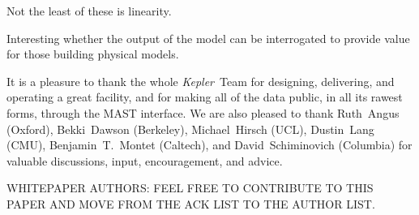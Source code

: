 \documentclass[12pt, preprint]{aastex}
\newcommand{\project}[1]{\textsl{#1}}
\newcommand{\Kepler}{\project{Kepler}}
\begin{document}
Not the least of these is linearity.

Interesting whether the output of the model can be interrogated to provide value for those building physical models.

\acknowledgements
It is a pleasure to thank the whole \Kepler\ Team
  for designing, delivering, and operating a great facility,
  and for making all of the data public, in all its rawest forms, through the MAST interface.
We are also pleased to thank
  Ruth~Angus (Oxford),
  Bekki~Dawson (Berkeley),
  Michael~Hirsch (UCL),
  Dustin~Lang (CMU),
  Benjamin~T.~Montet (Caltech),
  and
  David~Schiminovich (Columbia)
for valuable discussions, input, encouragement, and advice.

WHITEPAPER AUTHORS:  FEEL FREE TO CONTRIBUTE TO THIS PAPER AND MOVE FROM THE ACK LIST TO THE AUTHOR LIST.
\end{document}
